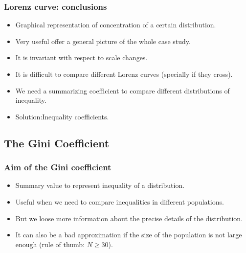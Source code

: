 \begin{frame}
\frametitle{Lorenz curve: conclusions}

\begin{itemize}
 \item Graphical representation of concentration of a certain distribution.
 \item Very useful offer a general picture of the whole case study.
 \item It is invariant with respect to scale changes.
 \item It is difficult to compare different Lorenz curves (specially if they cross).
 \item We need a summarizing coefficient to compare different distributions of
inequality.
 \item Solution:Inequality coefficients.
\end{itemize}

\end{frame}

\subsection{The Gini Coefficient}



\begin{frame}
\frametitle{Aim of the Gini coefficient}

\begin{itemize}
 \item Summary value to represent inequality of a distribution.
 \item Useful when we need to compare inequalities in different populations.
 \item But we loose more information about the precise details of the distribution.
 \item It can also be a bad approximation if the size of the population
is not large enough (rule of thumb:  $N\geq30$).
\end{itemize}

\end{frame}


